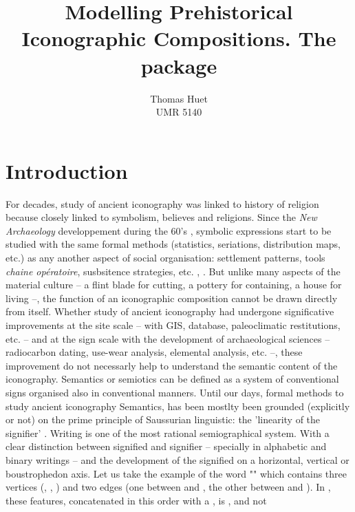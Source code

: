 \documentclass[article]{jss}\usepackage[]{graphicx}\usepackage[]{color}
\author{Thomas Huet\\UMR 5140}
\title{Modelling Prehistorical Iconographic Compositions. The \proglang{R} package \pkg{decorr}}
\begin{document}

\section[Introduction]{Introduction} \label{sec:intro}

For decades, study of ancient iconography was linked to history of religion because closely linked to symbolism, believes and religions. Since the \textit{New Archaeology} developpement during the 60's \citep{Clarke14}, symbolic expressions start to be studied with the same formal methods (statistics, seriations, distribution maps, etc.) as any another aspect of social organisation: settlement patterns, tools \emph{chaine opératoire}, susbsitence strategies, etc. \citep{Renfrew91}, \citep{LeroiGourhan92}. But unlike many aspects of the material culture -- a flint blade for cutting, a pottery for containing, a house for living --, the function of an iconographic composition cannot be drawn directly from itself. Whether study of ancient iconography had  undergone significative improvements at the site scale -- with GIS, database, paleoclimatic restitutions, etc. -- and at the sign scale with the development of archaeological sciences -- radiocarbon dating, use-wear analysis, elemental analysis, etc. --, these improvement do not necessarly help to understand the semantic content of the iconography.
Semantics or semiotics can be defined as a system of conventional signs organised also in conventional manners.  
Until our days, formal methods to study ancient iconography Semantics, has been mostlty been grounded (explicitly or not) on the prime principle of Saussurian linguistic: the 'linearity of the signifier' \citep{Saussure89}.  
Writing is one of the most rational semiographical system. With a clear distinction between signified and signifier -- specially in alphabetic and binary writings -- and the development of the signified on a horizontal, vertical or boustrophedon axis. 
Let us take the example of the word "" which contains three vertices (, , ) and two edges (one between  and , the other between  and ). In , these features, concatenated in this order with a , is , and not 
\end{document}
